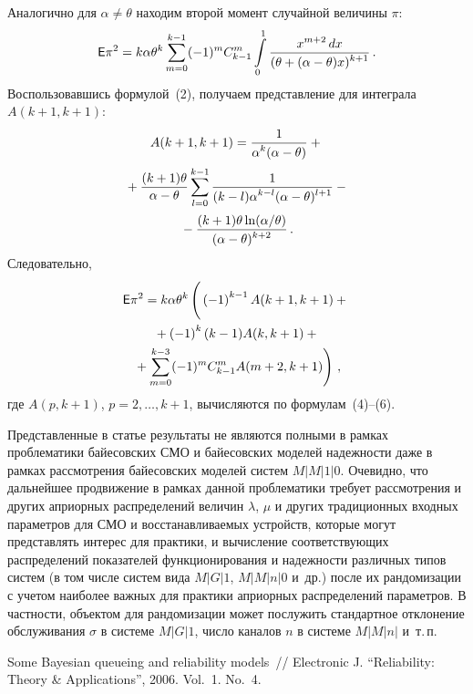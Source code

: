 \begin{multicols}{2}
Аналогично для $\alpha\neq\theta$ находим второй момент случайной величины $\pi$:
$$
{\sf E}\pi^2=k\alpha\theta^k\sum_{m=0}^{k-1}(-1)^mC_{k-1}^m\int\limits_{0}^{1}\displaystyle\frac{\displaystyle x^{m+2}\, dx\mathstrut}{\displaystyle {(\theta+
(\alpha-\theta)x)^{k+1}}\mathstrut}\,.
$$
Воспользовавшись формулой~(2), получаем пред\-став\-ле\-ние для интеграла $A(k+1,k+1)$:
\begin{multline}
A(k+1,k+1)=\displaystyle\frac{\displaystyle 1\mathstrut}{\displaystyle {\alpha^k(\alpha-\theta)}\mathstrut}+{}\\[2pt]
{}+\displaystyle\frac{\displaystyle (k+1)\theta\mathstrut}{\displaystyle {\alpha-\theta}\mathstrut}\sum_{l=0}^{k-1}
\displaystyle\frac{\displaystyle 1\mathstrut}{\displaystyle {(k-l)\alpha^{k-l}(\alpha-\theta)^{l+1}}\mathstrut}-{}\\[2pt]
{}-\displaystyle\frac{\displaystyle (k+1)\theta\ln (\alpha/\theta)\mathstrut}{\displaystyle {(\alpha
-\theta)^{k+2}}\mathstrut}\,.
\end{multline}
Следовательно,
\begin{multline*}
\e\pi^2=k\alpha\theta^k\left (\vphantom{\sum_{m=0}^{k-3}}
\left(-1\right)^{k-1}A(k+1,k+1)+{}\right.\\
{}+\left(-1\right)^k(k-1)A(k,k+1)+{}\\
\left.{}+\sum_{m=0}^{k-3}(-1)^mC_{k-1}^m A(m+2,k+1)\right)\,,
\end{multline*}
где $A(p,k+1)$, $p=2,\ldots,k+1$, вычисляются по формулам~(4)--(6).

Представленные в статье результаты не являются полными в рамках проблематики байесовских СМО и байесовских моделей
надежности даже в рамках рассмотрения байесовских моделей систем $M\vert M\vert 1 \vert 0$. Очевидно, что дальнейшее продвижение в рамках
данной проблематики требует рассмотрения и других априорных распределений величин $\lambda$, $\mu$ и других
традиционных входных параметров для СМО и восстанавливаемых устройств, которые могут представлять интерес для практики,
и вычисление соответствующих распределений показателей функционирования и надежности различных типов систем (в том
числе систем вида $M \vert G \vert 1$, $M \vert M \vert n \vert 0$ и~др.) после их рандомизации с учетом наиболее важных для практики априорных
распределений параметров. В частности, объектом для рандомизации может послужить
стандартное отклонение обслуживания $\sigma$ в системе  $M \vert G \vert 1$, число каналов $n$ в системе $M\vert M\vert n\vert$
и~т.\,п.


{\small\frenchspacing
{%
\begin{thebibliography}{9}
Some Bayesian queueing and reliability models~// 
Electronic J. ``Reliability: Theory \& Applications'', 2006. Vol.~1. No.~4.


\end{thebibliography}}}
\end{multicols}
